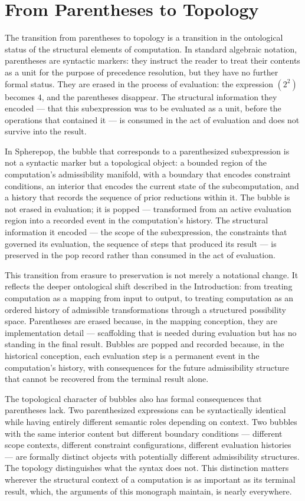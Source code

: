 \documentclass[12pt,openany]{book}
\theoremstyle{plain}
\theoremstyle{definition}
\theoremstyle{remark}
\begin{document}
\section{From Parentheses to Topology}

The transition from parentheses to topology is a transition in the ontological status of the structural elements of computation. In standard algebraic notation, parentheses are syntactic markers: they instruct the reader to treat their contents as a unit for the purpose of precedence resolution, but they have no further formal status. They are erased in the process of evaluation: the expression $(2^2)$ becomes $4$, and the parentheses disappear. The structural information they encoded — that this subexpression was to be evaluated as a unit, before the operations that contained it — is consumed in the act of evaluation and does not survive into the result.

In Spherepop, the bubble that corresponds to a parenthesized subexpression is not a syntactic marker but a topological object: a bounded region of the computation's admissibility manifold, with a boundary that encodes constraint conditions, an interior that encodes the current state of the subcomputation, and a history that records the sequence of prior reductions within it. The bubble is not erased in evaluation; it is popped — transformed from an active evaluation region into a recorded event in the computation's history. The structural information it encoded — the scope of the subexpression, the constraints that governed its evaluation, the sequence of steps that produced its result — is preserved in the pop record rather than consumed in the act of evaluation.

This transition from erasure to preservation is not merely a notational change. It reflects the deeper ontological shift described in the Introduction: from treating computation as a mapping from input to output, to treating computation as an ordered history of admissible transformations through a structured possibility space. Parentheses are erased because, in the mapping conception, they are implementation detail — scaffolding that is needed during evaluation but has no standing in the final result. Bubbles are popped and recorded because, in the historical conception, each evaluation step is a permanent event in the computation's history, with consequences for the future admissibility structure that cannot be recovered from the terminal result alone.

The topological character of bubbles also has formal consequences that parentheses lack. Two parenthesized expressions can be syntactically identical while having entirely different semantic roles depending on context. Two bubbles with the same interior content but different boundary conditions — different scope contexts, different constraint configurations, different evaluation histories — are formally distinct objects with potentially different admissibility structures. The topology distinguishes what the syntax does not. This distinction matters wherever the structural context of a computation is as important as its terminal result, which, the arguments of this monograph maintain, is nearly everywhere.
\end{document}

